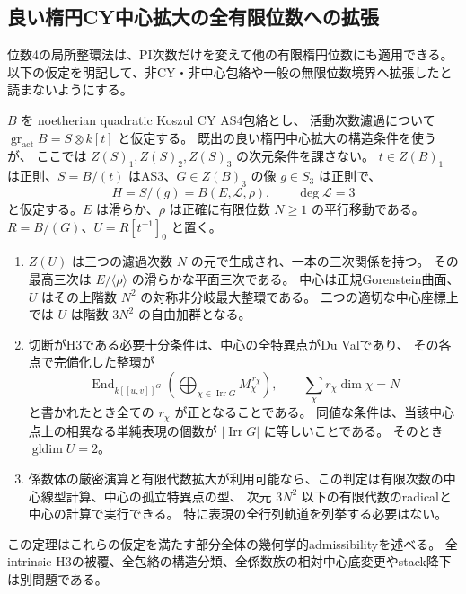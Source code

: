 \subsection{良い楕円CY中心拡大の全有限位数への拡張}
\label{subsec:finite-order-elliptic-criterion}
位数4の局所整環法は、PI次数だけを変えて他の有限楕円位数にも適用できる。
以下の仮定を明記して、非CY・非中心包絡や一般の無限位数境界へ拡張したと読まないようにする。

\begin{theorem}[有限楕円位数の中心と幾何学的H3判定]
\label{thm:finite-order-elliptic-admissibility}
$B$ を noetherian quadratic Koszul CY AS4包絡とし、
活動次数濾過について $\operatorname{gr}_{\mathrm{act}}B=S\otimes k[t]$ と仮定する。
既出の良い楕円中心拡大の構造条件を使うが、
ここでは $Z(S)_1,Z(S)_2,Z(S)_3$ の次元条件を課さない。
$t\in Z(B)_1$ は正則、$S=B/(t)$ はAS3、$G\in Z(B)_3$ の像 $g\in S_3$ は正則で、
\[
 H=S/(g)=B(E,\mathcal L,\rho),\qquad \deg\mathcal L=3
\]
と仮定する。$E$ は滑らか、$\rho$ は正確に有限位数 $N\ge1$ の平行移動である。
$R=B/(G)$、$U=R[t^{-1}]_0$ と置く。
\begin{enumerate}
\item $Z(U)$ は三つの濾過次数 $N$ の元で生成され、一本の三次関係を持つ。
その最高三次は $E/\langle\rho\rangle$ の滑らかな平面三次である。
中心は正規Gorenstein曲面、$U$ はその上階数 $N^2$ の対称非分岐最大整環である。
二つの適切な中心座標上では $U$ は階数 $3N^2$ の自由加群となる。
\item 切断がH3である必要十分条件は、中心の全特異点がDu Valであり、
その各点で完備化した整環が
\[
 \operatorname{End}_{k[[u,v]]^G}
   \left(\bigoplus_{\chi\in\operatorname{Irr}G}M_\chi^{\,r_\chi}\right),
 \qquad \sum_\chi r_\chi\dim\chi=N
\]
と書かれたとき全ての $r_\chi$ が正となることである。
同値な条件は、当該中心点上の相異なる単純表現の個数が
$|\operatorname{Irr}G|$ に等しいことである。
そのとき $\operatorname{gldim}U=2$。
\item 係数体の厳密演算と有限代数拡大が利用可能なら、この判定は有限次数の中心線型計算、中心の孤立特異点の型、
次元 $3N^2$ 以下の有限代数のradicalと中心の計算で実行できる。
特に表現の全行列軌道を列挙する必要はない。
\end{enumerate}
この定理はこれらの仮定を満たす部分全体の幾何学的admissibilityを述べる。
全intrinsic H3の被覆、全包絡の構造分類、全係数族の相対中心底変更やstack降下は別問題である。
\end{theorem}
